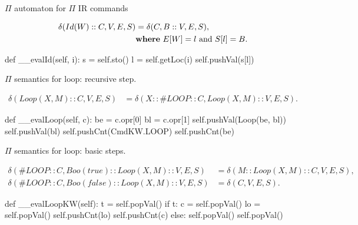\documentclass{beamer}
\begin{document}
\begin{frame}{{\color{red}$\Pi$ automaton} for {\color{red}$\Pi$ IR} commands}
\begin{scriptsize}
\begin{align}
\delta(Id(W) :: C, V, E, S) & = \delta(C, B :: V, E, S), \nonumber \\ & \text{\bf where}~ E[W] = l ~\text{and}~ S[l] = B. \nonumber 
\end{align}
\end{scriptsize}
        
\begin{python}
    def __evalId(self, i):
        s = self.sto()
        l = self.getLoc(i)
        self.pushVal(s[l])
\end{python}

\framebreak
       
{\color{red}$\Pi$}  semantics for loop: recursive step.

\begin{scriptsize}
\begin{align}
\delta(Loop(X, M) :: C, V, E, S) & = \delta(X :: \#LOOP :: C, Loop(X, M) :: V, E, S). \nonumber 
\end{align}
\end{scriptsize}
       
\begin{python}
    def __evalLoop(self, c):
        be = c.opr[0]
        bl = c.opr[1]
        self.pushVal(Loop(be, bl))
        self.pushVal(bl)
        self.pushCnt(CmdKW.LOOP)
        self.pushCnt(be)
\end{python}

\framebreak
       
{\color{red}$\Pi$}  semantics for loop: basic steps.

\begin{scriptsize}
\begin{align}
\delta(\#LOOP :: C, Boo(true) :: Loop(X, M) :: V, E, S) & = \delta(M :: Loop(X, M) :: C, V, E, S), \nonumber \\
\delta(\#LOOP :: C, Boo(false) :: Loop(X, M) :: V, E, S) & = \delta(C, V, E, S). \nonumber
\end{align}
\end{scriptsize}
       
\begin{python}
    def __evalLoopKW(self):
        t = self.popVal()
        if t:
            c = self.popVal()
            lo = self.popVal()
            self.pushCnt(lo)
            self.pushCnt(c)
        else:
            self.popVal()
            self.popVal()
\end{python}


\end{frame}
\end{document}
